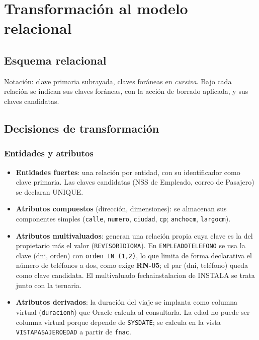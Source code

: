 \documentclass[11pt,a4paper]{article}
\DeclareRobustCommand{\_}{\textunderscore\allowbreak}
\newcommand{\RN}[1]{\textbf{RN-#1}}
\newcommand{\tb}[1]{\texttt{#1}}
\begin{document}
\section{Transformación al modelo relacional}
\subsection{Esquema relacional}
Notación: clave primaria \underline{subrayada}, claves foráneas en \textit{cursiva}. Bajo cada relación se indican sus claves foráneas, con la acción de borrado aplicada, y sus claves candidatas.

{\small}

\subsection{Decisiones de transformación}
\subsubsection*{Entidades y atributos}
\begin{itemize}
\item \textbf{Entidades fuertes}: una relación por entidad, con su identificador como clave primaria. Las claves candidatas (NSS de Empleado, correo de Pasajero) se declaran UNIQUE.
\item \textbf{Atributos compuestos} (dirección, dimensiones): se almacenan sus componentes simples (\tb{calle}, \tb{numero}, \tb{ciudad}, \tb{cp}; \tb{ancho\_cm}, \tb{largo\_cm}).
\item \textbf{Atributos multivaluados}: generan una relación propia cuya clave es la del propietario más el valor (\tb{REVISOR\_IDIOMA}). En \tb{EMPLEADO\_TELEFONO} se usa la clave (dni, orden) con \tb{orden IN (1,2)}, lo que limita de forma declarativa el número de teléfonos a dos, como exige \RN{05}; el par (dni, teléfono) queda como clave candidata. El multivaluado fecha\_instalacion de INSTALA se trata junto con la ternaria.
\item \textbf{Atributos derivados}: la duración del viaje se implanta como columna virtual (\tb{duracion\_h}) que Oracle calcula al consultarla. La edad no puede ser columna virtual porque depende de \tb{SYSDATE}; se calcula en la vista \tb{VISTA\_PASAJERO\_EDAD} a partir de \tb{f\_nac}.
\end{itemize}
\end{document}
